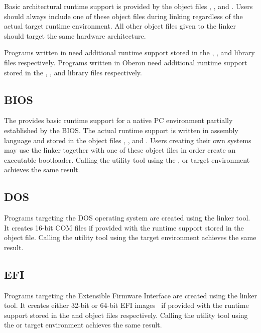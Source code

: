 Basic architectural runtime support is provided by the object files , , and .
Users should always include one of these object files during linking regardless of the actual target runtime environment.
All other object files given to the linker should target the same hardware architecture.

Programs written in \cpp{} need additional runtime support stored in the , , and  library files respectively.
Programs written in Oberon need additional runtime support stored in the , , and  library files respectively.
\seecpp\seeoberon

\subsection{BIOS}

The \ecs{} provides basic runtime support for a native PC environment partially established by the BIOS\@.
The actual runtime support is written in assembly language and stored in the object files , , and .
Users creating their own systems may use the  linker together with one of these object files in order create an executable bootloader.
Calling the  utility tool using the ,  or  target environment achieves the same result.

\subsection{DOS}

Programs targeting the DOS operating system are created using the  linker tool.
It creates 16-bit COM files if provided with the runtime support stored in the  object file.
Calling the  utility tool using the  target environment achieves the same result.

\subsection{EFI}

Programs targeting the Extensible Firmware Interface are created using the  linker tool.
It creates either 32-bit or 64-bit EFI images~\cite{exefile} if provided with the runtime support stored in the  and  object files respectively.
Calling the  utility tool using the  or  target environment achieves the same result.

